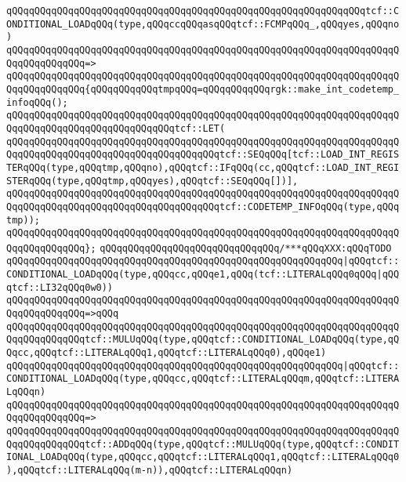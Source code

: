 \verb|qQQqqQQqqQQqqQQqqQQqqQQqqQQqqQQqqQQqqQQqqQQqqQQqqQQqqQQqqQQqqQQqtcf::CONDITIONAL_LOADqQQq(type,qQQqccqQQqasqQQqtcf::FCMPqQQq_,qQQqyes,qQQqno)|\newline
\verb|qQQqqQQqqQQqqQQqqQQqqQQqqQQqqQQqqQQqqQQqqQQqqQQqqQQqqQQqqQQqqQQqqQQqqQQqqQQqqQQqqQQq=>|\newline
\verb|qQQqqQQqqQQqqQQqqQQqqQQqqQQqqQQqqQQqqQQqqQQqqQQqqQQqqQQqqQQqqQQqqQQqqQQqqQQqqQQqqQQq{qQQqqQQqqQQqtmpqQQq=qQQqqQQqqQQqrgk::make_int_codetemp_infoqQQq();|\newline
\newline
\verb|qQQqqQQqqQQqqQQqqQQqqQQqqQQqqQQqqQQqqQQqqQQqqQQqqQQqqQQqqQQqqQQqqQQqqQQqqQQqqQQqqQQqqQQqqQQqqQQqqQQqtcf::LET(|\newline
\verb|qQQqqQQqqQQqqQQqqQQqqQQqqQQqqQQqqQQqqQQqqQQqqQQqqQQqqQQqqQQqqQQqqQQqqQQqqQQqqQQqqQQqqQQqqQQqqQQqqQQqqQQqqQQqtcf::SEQqQQq[tcf::LOAD_INT_REGISTERqQQq(type,qQQqtmp,qQQqno),qQQqtcf::IFqQQq(cc,qQQqtcf::LOAD_INT_REGISTERqQQq(type,qQQqtmp,qQQqyes),qQQqtcf::SEQqQQq[])],|\newline
\verb|qQQqqQQqqQQqqQQqqQQqqQQqqQQqqQQqqQQqqQQqqQQqqQQqqQQqqQQqqQQqqQQqqQQqqQQqqQQqqQQqqQQqqQQqqQQqqQQqqQQqqQQqqQQqtcf::CODETEMP_INFOqQQq(type,qQQqtmp));|\newline
\verb|qQQqqQQqqQQqqQQqqQQqqQQqqQQqqQQqqQQqqQQqqQQqqQQqqQQqqQQqqQQqqQQqqQQqqQQqqQQqqQQqqQQq};|\newline
\verb|qQQqqQQqqQQqqQQqqQQqqQQqqQQqqQQq/***qQQqXXX:qQQqTODO|\newline
\verb|qQQqqQQqqQQqqQQqqQQqqQQqqQQqqQQqqQQqqQQqqQQqqQQqqQQqqQQqqQQq|\verb#|qQQqtcf::CONDITIONAL_LOADqQQq(type,qQQqcc,qQQqe1,qQQq(tcf::LITERALqQQq0qQQq|qQQqtcf::LI32qQQq0w0))#\newline
\verb|qQQqqQQqqQQqqQQqqQQqqQQqqQQqqQQqqQQqqQQqqQQqqQQqqQQqqQQqqQQqqQQqqQQqqQQqqQQqqQQqqQQq=>qQQq|\newline
\verb|qQQqqQQqqQQqqQQqqQQqqQQqqQQqqQQqqQQqqQQqqQQqqQQqqQQqqQQqqQQqqQQqqQQqqQQqqQQqqQQqqQQqtcf::MULUqQQq(type,qQQqtcf::CONDITIONAL_LOADqQQq(type,qQQqcc,qQQqtcf::LITERALqQQq1,qQQqtcf::LITERALqQQq0),qQQqe1)|\newline
\newline
\verb|qQQqqQQqqQQqqQQqqQQqqQQqqQQqqQQqqQQqqQQqqQQqqQQqqQQqqQQqqQQq|\verb#|qQQqtcf::CONDITIONAL_LOADqQQq(type,qQQqcc,qQQqtcf::LITERALqQQqm,qQQqtcf::LITERALqQQqn)#\newline
\verb|qQQqqQQqqQQqqQQqqQQqqQQqqQQqqQQqqQQqqQQqqQQqqQQqqQQqqQQqqQQqqQQqqQQqqQQqqQQqqQQqqQQq=>|\newline
\verb|qQQqqQQqqQQqqQQqqQQqqQQqqQQqqQQqqQQqqQQqqQQqqQQqqQQqqQQqqQQqqQQqqQQqqQQqqQQqqQQqqQQqtcf::ADDqQQq(type,qQQqtcf::MULUqQQq(type,qQQqtcf::CONDITIONAL_LOADqQQq(type,qQQqcc,qQQqtcf::LITERALqQQq1,qQQqtcf::LITERALqQQq0),qQQqtcf::LITERALqQQq(m-n)),qQQqtcf::LITERALqQQqn)|\newline
